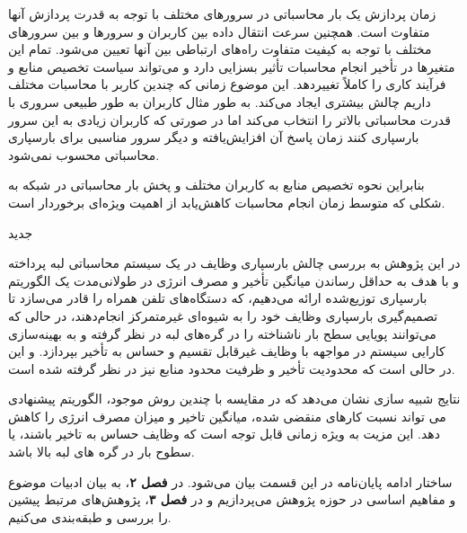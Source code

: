 زمان پردازش یک بار محاسباتی در سرورهای مختلف با توجه به قدرت پردازش آنها متفاوت است. همچنین سرعت انتقال داده بین کاربران و سرورها و بین سرورهای مختلف با توجه به کیفیت متفاوت راه‌های ارتباطی بین آنها تعیین می‌شود. تمام این متغیرها در تأخیر انجام محاسبات تأثیر بسزایی دارد و می‌تواند سیاست تخصیص منابع و فرآیند کاری را کاملاً تغییردهد. این موضوع زمانی که چندین کاربر با محاسبات مختلف داریم چالش بیشتری ایجاد می‌کند. به طور مثال کاربران به طور طبیعی سروری با قدرت محاسباتی بالاتر را انتخاب می‌کند اما در صورتی که کاربران زیادی به این سرور بارسپاری کنند زمان پاسخ آن افزایش‌یافته و دیگر سرور مناسبی برای بارسپاری محاسباتی محسوب نمی‌شود.

بنابراین نحوه تخصیص منابع به کاربران مختلف و پخش بار محاسباتی در شبکه به شکلی که متوسط زمان انجام محاسبات کاهش‌یابد از اهمیت ویژه‌ای برخوردار است.


‌جدید


در این پژوهش به بررسی چالش بارسپاری وظایف در یک سیستم محاسباتی لبه پرداخته و با هدف به حداقل رساندن میانگین تأخیر و مصرف انرژی در طولانی‌مدت یک الگوریتم بارسپاری توزیع‌شده ارائه می‌دهیم، که دستگاه‌های تلفن همراه را قادر می‌سازد تا تصمیم‌گیری بارسپاری وظایف خود را به شیوه‌ای غیرمتمرکز انجام‌دهند، در حالی که می‌توانند پویایی سطح بار ناشناخته را در گره‌های لبه در نظر گرفته و به بهینه‌سازی کارایی سیستم در مواجهه با وظایف غیرقابل تقسیم و حساس به تأخیر بپردازد. و این در حالی است که محدودیت تأخیر و ظرفیت محدود منابع نیز در نظر گرفته شده است. 

نتایج شبیه سازی نشان می‌دهد که در مقایسه با چندین روش موجود، الگوریتم پیشنهادی می تواند نسبت کارهای منقضی شده، میانگین تاخیر و میزان مصرف انرژی را کاهش دهد. این مزیت به ویژه زمانی قابل توجه است که وظایف حساس به تاخیر باشند، یا سطوح بار در گره های لبه بالا باشد.


ساختار ادامه پایان‌نامه در این قسمت بیان می‌شود. در  \textbf{فصل ۲}، به بیان ادبیات موضوع و مفاهیم اساسی در حوزه پژوهش می‌پردازیم و در \textbf{فصل ۳}، پژوهش‌های مرتبط پیشین را بررسی و طبقه‌بندی می‌کنیم.

